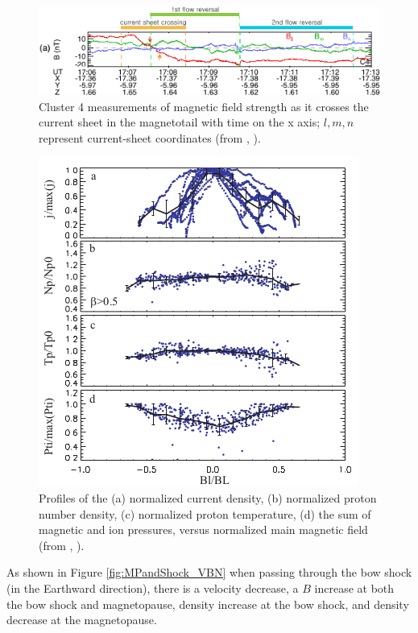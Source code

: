 \begin{figure}
	\centering
	\includegraphics[scale=0.75]{images/Cur_sheet_B.png}
	\caption{Cluster 4 measurements of magnetic field strength as it crosses the
	current sheet in the magnetotail with time on the x axis; $l,m,n$
	represent current-sheet coordinates (from \citeauthor{Hwang2013},
	\citeyear{Hwang2013}).}
    \label{fig:Cur_sheet_B}
	\figSpace
\end{figure}

\begin{figure}
	\centering
	\includegraphics[scale=0.75]{images/Cur_sheet_N.png}
	\caption{Profiles of the (a) normalized current density, (b) normalized proton
	number density, (c) normalized proton temperature, (d) the sum of magnetic
	and ion pressures, versus normalized main magnetic field (from
\citeauthor{Runov2006}, \citeyear{Runov2006}).}
    \label{fig:Cur_sheet_N}
	\figSpace
\end{figure}
As shown in Figure \ref{fig:MPandShock_VBN} when passing through the bow shock
(in the Earthward direction), there is a velocity decrease, a $B$ increase at both the bow shock and magnetopause, density increase at the bow shock, and density decrease at the magnetopause.

